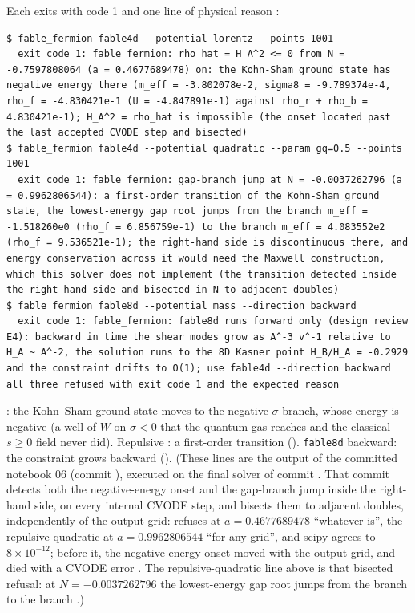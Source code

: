 Each exits with code 1 and one line of physical reason :
\begin{Verbatim}[fontsize=\scriptsize]
$ fable_fermion fable4d --potential lorentz --points 1001
  exit code 1: fable_fermion: rho_hat = H_A^2 <= 0 from N = -0.7597808064 (a = 0.4677689478) on: the Kohn-Sham ground state has negative energy there (m_eff = -3.802078e-2, sigma8 = -9.789374e-4, rho_f = -4.830421e-1 (U = -4.847891e-1) against rho_r + rho_b = 4.830421e-1); H_A^2 = rho_hat is impossible (the onset located past the last accepted CVODE step and bisected)
$ fable_fermion fable4d --potential quadratic --param gq=0.5 --points 1001
  exit code 1: fable_fermion: gap-branch jump at N = -0.0037262796 (a = 0.9962806544): a first-order transition of the Kohn-Sham ground state, the lowest-energy gap root jumps from the branch m_eff = -1.518260e0 (rho_f = 6.856759e-1) to the branch m_eff = 4.083552e2 (rho_f = 9.536521e-1); the right-hand side is discontinuous there, and energy conservation across it would need the Maxwell construction, which this solver does not implement (the transition detected inside the right-hand side and bisected in N to adjacent doubles)
$ fable_fermion fable8d --potential mass --direction backward
  exit code 1: fable_fermion: fable8d runs forward only (design review E4): backward in time the shear modes grow as A^-3 v^-1 relative to H_A ~ A^-2, the solution runs to the 8D Kasner point H_B/H_A = -0.2929 and the constraint drifts to O(1); use fable4d --direction backward
all three refused with exit code 1 and the expected reason
\end{Verbatim}
: the Kohn--Sham ground state moves to the negative-$\sigma$ branch, whose energy is negative (a
well of $W$ on $\sigma<0$ that the quantum gas reaches and the classical $s\geq0$ field never did). Repulsive
: a first-order transition (). \texttt{fable8d} backward: the constraint grows
backward (). (These lines are the output of the committed notebook 06 (commit
), executed on the final solver of commit . That commit detects both the
negative-energy onset and the gap-branch jump inside the right-hand side, on every internal CVODE step, and
bisects them to adjacent doubles, independently of the output grid:  refuses at
$a=0.4677689478$ ``whatever  is'', the repulsive quadratic at $a=0.9962806544$ ``for any
grid'', and scipy agrees to $8\times10^{-12}$; before it, the negative-energy onset moved with the output
grid, and  died with a CVODE  error . The
repulsive-quadratic line above is that bisected refusal: at $N=-0.0037262796$ the lowest-energy gap root
jumps from the branch  to the branch .)

